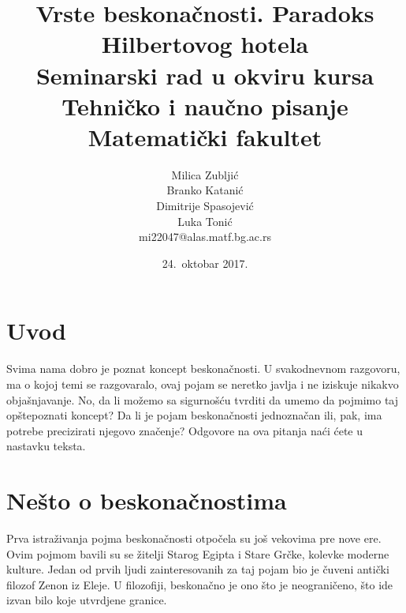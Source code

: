 \documentclass[a4paper]{article}
\begin{document}
\title{Vrste beskonačnosti. Paradoks Hilbertovog hotela\\ \small{Seminarski rad u okviru kursa\\Tehničko i naučno pisanje\\ Matematički fakultet}}

\author{Milica Zubljić\\ Branko Katanić\\ Dimitrije Spasojević\\ Luka Tonić\\ mi22047@alas.matf.bg.ac.rs}
\date{24.~oktobar 2017.} %
\maketitle


\tableofcontents %

\newpage

\section{Uvod}
\label{poglavlje:uvod}

Svima nama dobro je poznat koncept beskonačnosti. U svakodnevnom razgovoru, ma o kojoj temi se razgovaralo, ovaj pojam se neretko javlja i ne iziskuje nikakvo objašnjavanje. No, da li možemo sa sigurnošću tvrditi da umemo da pojmimo taj opštepoznati koncept? Da li je pojam beskonačnosti jednoznačan ili, pak, ima potrebe precizirati njegovo značenje? Odgovore na ova pitanja naći ćete u nastavku teksta.

\section{Nešto o beskonačnostima}
\label{poglavlje:Nešto o beskonačnostima}

Prva istraživanja pojma beskonačnosti otpočela su još vekovima pre nove ere. Ovim pojmom bavili su se žitelji Starog Egipta i Stare Grčke, kolevke moderne kulture. Jedan od prvih ljudi zainteresovanih za taj pojam bio je čuveni antički filozof Zenon iz Eleje. \cite{Zenon} U filozofiji, beskonačno je ono što je neograničeno, što ide izvan bilo koje utvrdjene granice.\\
\end{document}
